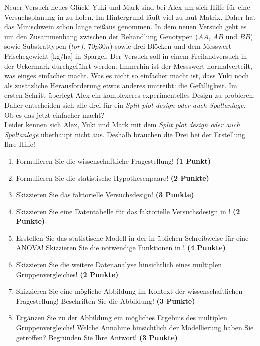 \documentclass[a4paper, 9pt]{scrartcl}\usepackage[]{graphicx}\usepackage[]{xcolor}
\begin{document}
Neuer Versuch neues Glück! Yuki und Mark sind bei Alex um sich Hilfe für eine Versuchsplanung in \Rlogo zu holen. Im Hintergrund läuft viel zu laut Matrix. Daher hat das Minischwein schon lange reißaus genommen. In dem neuen Versuch geht es um den Zusammenhang zwischen der Behandlung Genotypen ($AA$, $AB$ und $BB$) sowie Substrattypen ($torf$, $70p30n$) sowie drei Blöcken und dem Messwert Frischegewicht [kg/ha] in Spargel. Der Versuch soll in einem Freilandversuch in der Uckermark durchgeführt werden. Immerhin ist der Messswert normalverteilt, was einges einfacher macht. Was es nicht so einfacher macht ist, dass Yuki noch als zusätzliche Herausforderung etwas anderes umtreibt: die Gefälligkeit. Im ersten Schritt überlegt Alex ein komplexeres experimentelles Design zu probieren. Daher entscheiden sich alle drei für ein \textit{Split plot design oder auch Spaltanlage}. Ob es das jetzt einfacher macht?\\

Leider kennen sich Alex, Yuki und Mark mit dem \textit{Split plot design oder auch Spaltanlage} überhaupt nicht aus. Deshalb brauchen die Drei bei der Erstellung Ihre Hilfe!

\begin{enumerate}
  \setcounter{enumi}{0}
  \item Formulieren Sie die wissenschaftliche Fragestellung! \textbf{(1 Punkt)}
  \item Formulieren Sie die statistische Hypothesenpaare! \textbf{(2 Punkte)}
  \item Skizzieren Sie das faktorielle Versuchsdesign! \textbf{(3 Punkte)}
  \item Skizzieren Sie eine Datentabelle für das faktorielle Versuchsdesign in \Rlogo! \textbf{(2 Punkte)}
  \item Erstellen Sie das statistische Modell in der in \Rlogo üblichen Schreibweise für eine ANOVA! Skizzieren Sie die notwendige Funktionen in \Rlogo! \textbf{(4 Punkte)}
  \item Skizzieren Sie die weitere Datenanalyse hinsichtlich eines multiplen Gruppenvergleiches! \textbf{(2 Punkte)}
  \item Skizzieren Sie eine mögliche Abbildung im Kontext der wissenschaftlichen Fragestellung! Beschriften Sie die Abbildung! \textbf{(3 Punkte)}
  \item Ergänzen Sie zu der Abbildung ein mögliches Ergebnis des multiplen Gruppenvergleichs! Welche Annahme hinsichtlich der Modellierung haben Sie getroffen? Begründen Sie Ihre Antwort! \textbf{(3 Punkte)}
\end{enumerate} 
\clearpage
\end{document}
